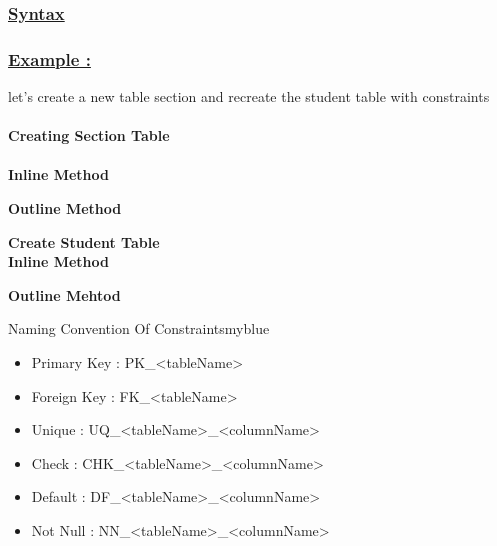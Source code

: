\subsubsection*{\underline{Syntax}}





\subsubsection*{\underline{Example :}}
let's create a new table section and recreate the student table with constraints\\\\
\textbf{Creating Section Table}\\\\
\textbf{Inline Method}



\textbf{Outline Method}




\textbf{Create Student Table}\\
\textbf{Inline Method}



\textbf{Outline Mehtod}



\begin{prettyBox}{Naming Convention Of Constraints}{myblue}
  \begin{itemize}
        \item Primary Key : PK\_\textless tableName\textgreater  
        \item Foreign Key : FK\_\textless tableName\textgreater
        \item Unique : UQ\_\textless tableName\textgreater\_\textless columnName\textgreater
        \item Check : CHK\_\textless tableName\textgreater\_\textless columnName\textgreater
        \item Default : DF\_\textless tableName\textgreater\_\textless columnName\textgreater
        \item Not Null : NN\_\textless tableName\textgreater\_\textless columnName\textgreater
    \end{itemize}   
\end{prettyBox}

